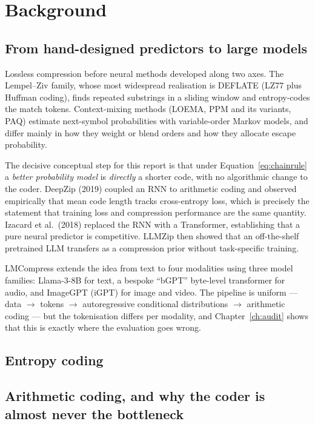 \documentclass[11pt,a4paper]{article}
\begin{document}
\section{Background}

\subsection{From hand-designed predictors to large models}

Lossless compression before neural methods developed along two axes. The
Lempel--Ziv family, whose most widespread realisation is DEFLATE (LZ77 plus
Huffman coding), finds repeated substrings in a sliding window and entropy-codes
the match tokens. Context-mixing methods (LOEMA, PPM and its variants, PAQ)
estimate next-symbol probabilities with variable-order Markov models, and differ
mainly in how they weight or blend orders and how they allocate escape
probability.

The decisive conceptual step for this report is that under
Equation~\eqref{eq:chainrule} a \emph{better probability model} is
\emph{directly} a shorter code, with no algorithmic change to the coder.
DeepZip (2019) coupled an RNN to arithmetic coding and observed empirically that
mean code length tracks cross-entropy loss, which is precisely the statement
that training loss and compression performance are the same quantity. Izacard
et al.\ (2018) replaced the RNN with a Transformer, establishing that a pure
neural predictor is competitive. LLMZip then showed that an off-the-shelf
pretrained LLM transfers as a compression prior without task-specific training.

LMCompress extends the idea from text to four modalities using three model
families: Llama-3-8B for text, a bespoke ``bGPT'' byte-level transformer for
audio, and ImageGPT (iGPT) for image and video. The pipeline is uniform --- data
$\to$ tokens $\to$ autoregressive conditional distributions $\to$ arithmetic
coding --- but the tokenisation differs per modality, and Chapter~\ref{ch:audit}
shows that this is exactly where the evaluation goes wrong.

\subsection{Entropy coding}

\subsection{Arithmetic coding, and why the coder is almost never the bottleneck}
\end{document}
